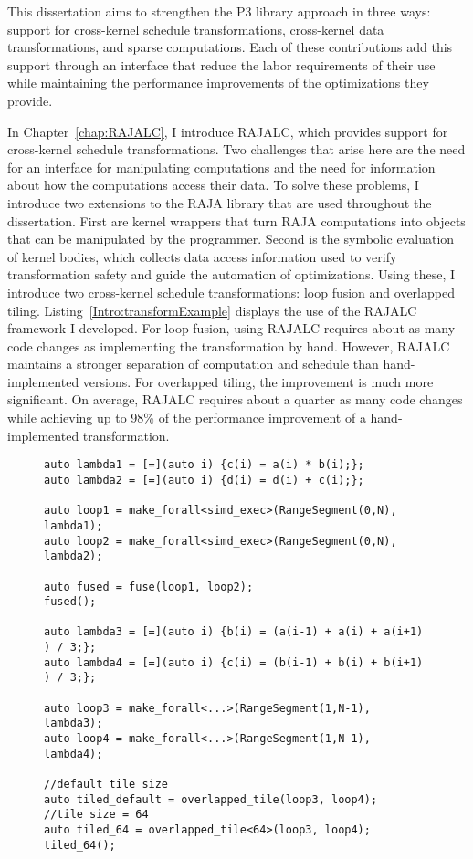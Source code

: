 This dissertation aims to strengthen the P3 library approach in three ways: support for cross-kernel schedule transformations, cross-kernel data transformations, and sparse computations.
Each of these contributions add this support through an interface that reduce the labor requirements of their use while maintaining the performance improvements of the optimizations they provide.

In Chapter~\ref{chap:RAJALC}, I introduce RAJALC, which provides support for cross-kernel schedule transformations.
Two challenges that arise here are the need for an interface for manipulating computations and the need for information about how the computations access their data.
To solve these problems, I introduce two extensions to the RAJA library that are used throughout the dissertation.
First are kernel wrappers that turn RAJA computations into objects that can be manipulated by the programmer.
Second is the symbolic evaluation of kernel bodies, which collects data access information used to verify transformation safety and guide the automation of optimizations.
Using these, I introduce two cross-kernel schedule transformations: loop fusion and overlapped tiling. 
Listing~\ref{Intro:transformExample} displays the use of the RAJALC framework I developed.
For loop fusion, using RAJALC requires about as many code changes as implementing the transformation by hand.
However, RAJALC maintains a stronger separation of computation and schedule than hand-implemented versions.
For overlapped tiling, the improvement is much more significant.
On average, RAJALC requires about a quarter as many code changes while achieving up to 98\% of the performance improvement of a hand-implemented transformation.
\begin{figure}[t]
\begin{lstlisting}[caption={Using the \texttt{fuse} and \texttt{overlapped\_tile} transformations.}, label={Intro:transformExample}]
auto lambda1 = [=](auto i) {c(i) = a(i) * b(i);};
auto lambda2 = [=](auto i) {d(i) = d(i) + c(i);};

auto loop1 = make_forall<simd_exec>(RangeSegment(0,N), lambda1);
auto loop2 = make_forall<simd_exec>(RangeSegment(0,N), lambda2);

auto fused = fuse(loop1, loop2);
fused();

auto lambda3 = [=](auto i) {b(i) = (a(i-1) + a(i) + a(i+1) ) / 3;};
auto lambda4 = [=](auto i) {c(i) = (b(i-1) + b(i) + b(i+1) ) / 3;};

auto loop3 = make_forall<...>(RangeSegment(1,N-1), lambda3);
auto loop4 = make_forall<...>(RangeSegment(1,N-1), lambda4);

//default tile size
auto tiled_default = overlapped_tile(loop3, loop4);
//tile size = 64
auto tiled_64 = overlapped_tile<64>(loop3, loop4);
tiled_64();
\end{lstlisting}
\end{figure}

